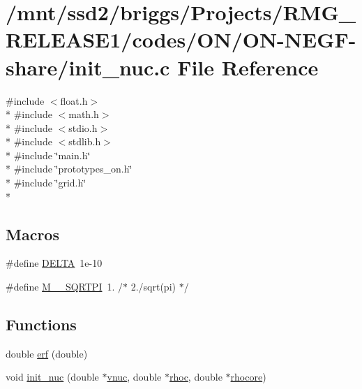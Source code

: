 \hypertarget{_o_n_2_o_n-_n_e_g_f-share_2init__nuc_8c}{\section{/mnt/ssd2/briggs/\-Projects/\-R\-M\-G\-\_\-\-R\-E\-L\-E\-A\-S\-E1/codes/\-O\-N/\-O\-N-\/\-N\-E\-G\-F-\/share/init\-\_\-nuc.c File Reference}
\label{_o_n_2_o_n-_n_e_g_f-share_2init__nuc_8c}
}
{\ttfamily \#include $<$float.\-h$>$}\\*
{\ttfamily \#include $<$math.\-h$>$}\\*
{\ttfamily \#include $<$stdio.\-h$>$}\\*
{\ttfamily \#include $<$stdlib.\-h$>$}\\*
{\ttfamily \#include \char`\"{}main.\-h\char`\"{}}\\*
{\ttfamily \#include \char`\"{}prototypes\-\_\-on.\-h\char`\"{}}\\*
{\ttfamily \#include \char`\"{}grid.\-h\char`\"{}}\\*
\subsection*{Macros}
\begin{DoxyCompactItemize}
\item 
\#define \hyperlink{_o_n_2_o_n-_n_e_g_f-share_2init__nuc_8c_a3fd2b1bcd7ddcf506237987ad780f495}{D\-E\-L\-T\-A}~1e-\/10
\item 
\#define \hyperlink{_o_n_2_o_n-_n_e_g_f-share_2init__nuc_8c_a631ff334c4a1a6db2e8a7ff4acbe48a5}{M\-\_\-\_\-\-S\-Q\-R\-T\-P\-I}~1.  /$\ast$ 2./sqrt(pi) $\ast$/
\end{DoxyCompactItemize}
\subsection*{Functions}
\begin{DoxyCompactItemize}
\item 
double \hyperlink{_o_n_2_o_n-_n_e_g_f-share_2init__nuc_8c_af00aa0dd70b74faf5361c10570a60a45}{erf} (double)
\item 
void \hyperlink{_o_n_2_o_n-_n_e_g_f-share_2init__nuc_8c_ade32dff510094ba85fc4880a4804b88b}{init\-\_\-nuc} (double $\ast$\hyperlink{md_8h_a46d07cd58431537b88a42087aa4e15f0}{vnuc}, double $\ast$\hyperlink{md_8h_a5e9e67f3a37119e4c22c096a300ca7a3}{rhoc}, double $\ast$\hyperlink{md_8h_a591b660d2f8ec39665ed0237c56502b9}{rhocore})
\end{DoxyCompactItemize}


